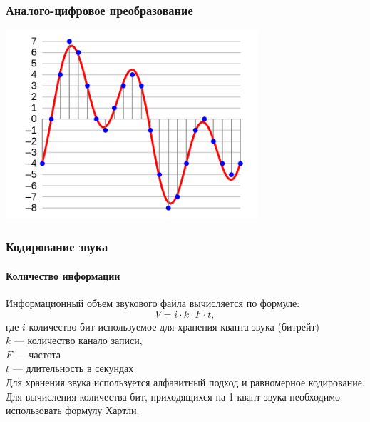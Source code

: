\begin{frame}
\frametitle{Аналого-цифровое преобразование}

\includegraphics[height=7cm]{images/sound.png}

\end{frame}


\begin{frame}
\frametitle{Кодирование звука}
\framesubtitle{Количество информации}

Информационный объем звукового файла вычисляется по формуле:
$$ V=i\cdot k\cdot F \cdot t,$$
где $i$-количество бит используемое для хранения кванта звука (битрейт)
\\ 
$k$ --- количество канало записи,\\
$F$ --- частота\\
$t$ --- длительность в секундах\\

Для хранения звука используется алфавитный подход и равномерное кодирование.
Для вычисления количества бит, приходящихся на 1 квант звука необходимо использовать формулу Хартли.
\end{frame}

